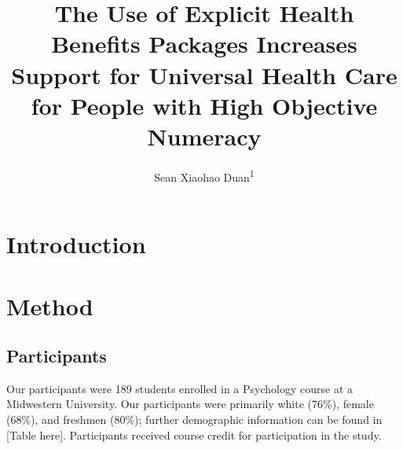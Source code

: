 \documentclass[
  english,
  man]{apa6}
\title{The Use of Explicit Health Benefits Packages Increases Support for Universal Health Care for People with High Objective Numeracy}
\author{Sean Xiaohao Duan\textsuperscript{1}}
\date{}
\affiliation{\vspace{0.5cm}\textsuperscript{1} University of Missouri}
\begin{document}
\maketitle

\hypertarget{introduction}{%
\section{Introduction}\label{introduction}}

\hypertarget{method}{%
\section{Method}\label{method}}

\hypertarget{participants}{%
\subsection{Participants}\label{participants}}

Our participants were 189 students enrolled in a Psychology course at a Midwestern University. Our participants were primarily white (76\%), female (68\%), and freshmen (80\%); further demographic information can be found in {[}Table here{]}. Participants received course credit for participation in the study.
\end{document}
